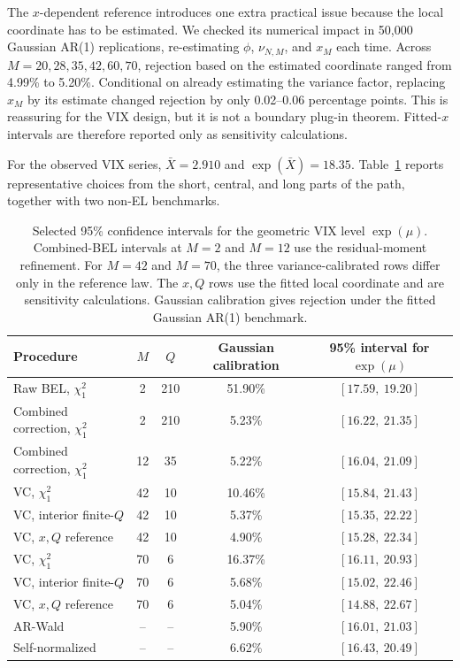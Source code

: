 \documentclass[12pt]{article}
\theoremstyle{remark}
\begin{document}
The $x$-dependent reference introduces one extra practical issue because the local coordinate has to be estimated. We checked its numerical impact in 50,000 Gaussian AR(1) replications, re-estimating $\phi$, $\nu_{N,M}$, and $x_M$ each time. Across $M=20,28,35,42,60,70$, rejection based on the estimated coordinate ranged from 4.99\% to 5.20\%. Conditional on already estimating the variance factor, replacing $x_M$ by its estimate changed rejection by only 0.02--0.06 percentage points. This is reassuring for the VIX design, but it is not a boundary plug-in theorem. Fitted-$x$ intervals are therefore reported only as sensitivity calculations.

For the observed VIX series, $\bar X=2.910$ and $\exp(\bar X)=18.35$. Table~\ref{tab:vix-intervals} reports representative choices from the short, central, and long parts of the path, together with two non-EL benchmarks.

\begin{table}[htbp]
\centering
\caption{Selected 95\% confidence intervals for the geometric VIX level $\exp(\mu)$. Combined-BEL intervals at $M=2$ and $M=12$ use the residual-moment refinement. For $M=42$ and $M=70$, the three variance-calibrated rows differ only in the reference law. The $x,Q$ rows use the fitted local coordinate and are sensitivity calculations. Gaussian calibration gives rejection under the fitted Gaussian AR(1) benchmark.}
\label{tab:vix-intervals}
\scriptsize
\setlength{\tabcolsep}{3.2pt}
\begin{tabular}{lcccc}
\toprule
Procedure & $M$ & $Q$ & Gaussian calibration & 95\% interval for $\exp(\mu)$ \\
\midrule
Raw BEL, $\chi_1^2$ & 2 & 210 & 51.90\% & $[17.59,\ 19.20]$ \\
Combined correction, $\chi_1^2$ & 2 & 210 & 5.23\% & $[16.22,\ 21.35]$ \\
Combined correction, $\chi_1^2$ & 12 & 35 & 5.22\% & $[16.04,\ 21.09]$ \\
\addlinespace
VC, $\chi_1^2$ & 42 & 10 & 10.46\% & $[15.84,\ 21.43]$ \\
VC, interior finite-$Q$ & 42 & 10 & 5.37\% & $[15.35,\ 22.22]$ \\
VC, $x,Q$ reference & 42 & 10 & 4.90\% & $[15.28,\ 22.34]$ \\
\addlinespace
VC, $\chi_1^2$ & 70 & 6 & 16.37\% & $[16.11,\ 20.93]$ \\
VC, interior finite-$Q$ & 70 & 6 & 5.68\% & $[15.02,\ 22.46]$ \\
VC, $x,Q$ reference & 70 & 6 & 5.04\% & $[14.88,\ 22.67]$ \\
\addlinespace
AR-Wald & -- & -- & 5.90\% & $[16.01,\ 21.03]$ \\
Self-normalized & -- & -- & 6.62\% & $[16.43,\ 20.49]$ \\
\bottomrule
\end{tabular}
\end{table}
\end{document}
